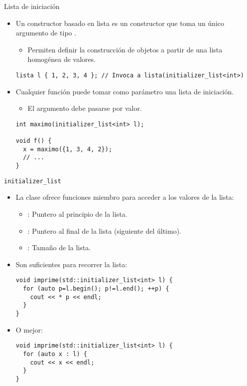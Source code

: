 \begin{frame}[fragile]{Lista de iniciación}
\begin{itemize}
  \item Un \alert{constructor basado en lista} es un constructor que toma un único argumento de tipo
        .
    \begin{itemize}
      \item Permiten definir la construcción de objetos a partir de una lista homogénea de valores.
    \end{itemize}
\begin{lstlisting}
lista l { 1, 2, 3, 4 }; // Invoca a lista(initializer_list<int>)
\end{lstlisting}
  \item Cualquier función puede tomar como parámetro una lista de iniciación.
    \begin{itemize}
      \item El argumento debe pasarse por valor.
    \end{itemize}
\begin{lstlisting}
int maximo(initializer_list<int> l);

void f() {
  x = maximo({1, 3, 4, 2});
  // ...
}
\end{lstlisting}
\end{itemize}
\end{frame}

\begin{frame}[fragile]{\texttt{initializer\_list}}
\begin{itemize}
  \item La clase  ofrece funciones miembro para acceder a los valores de la lista:
    \begin{itemize}
      \item {}: Puntero al principio de la lista.
      \item {}: Puntero al final de la lista (siguiente del último).
      \item {}: Tamaño de la lista.
    \end{itemize}
  \item Son suficientes para recorrer la lista:
\begin{lstlisting}
void imprime(std::initializer_list<int> l) {
  for (auto p=l.begin(); p!=l.end(); ++p) {
    cout << * p << endl;
  }
}
\end{lstlisting}
  \item O mejor:
\begin{lstlisting}
void imprime(std::initializer_list<int> l) {
  for (auto x : l) {
    cout << x << endl;
  }
}
\end{lstlisting}
\end{itemize}
\end{frame}

